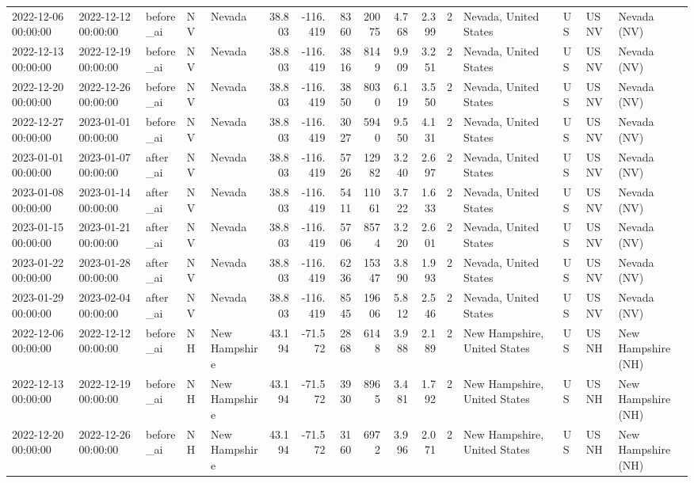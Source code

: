 \begin{tabular}{lllllrrrrrrlllll}
2022-12-06 00:00:00 & 2022-12-12 00:00:00 & before\_ai & NV & Nevada & 38.803 & -116.419 & 8360 & 20075 & 4.768 & 2.399 & 2 & Nevada, United States & US & USNV & Nevada (NV) \\
2022-12-13 00:00:00 & 2022-12-19 00:00:00 & before\_ai & NV & Nevada & 38.803 & -116.419 & 3816 & 8149 & 9.909 & 3.251 & 2 & Nevada, United States & US & USNV & Nevada (NV) \\
2022-12-20 00:00:00 & 2022-12-26 00:00:00 & before\_ai & NV & Nevada & 38.803 & -116.419 & 3850 & 8030 & 6.119 & 3.550 & 2 & Nevada, United States & US & USNV & Nevada (NV) \\
2022-12-27 00:00:00 & 2023-01-01 00:00:00 & before\_ai & NV & Nevada & 38.803 & -116.419 & 3027 & 5940 & 9.550 & 4.131 & 2 & Nevada, United States & US & USNV & Nevada (NV) \\
2023-01-01 00:00:00 & 2023-01-07 00:00:00 & after\_ai & NV & Nevada & 38.803 & -116.419 & 5726 & 12982 & 3.240 & 2.697 & 2 & Nevada, United States & US & USNV & Nevada (NV) \\
2023-01-08 00:00:00 & 2023-01-14 00:00:00 & after\_ai & NV & Nevada & 38.803 & -116.419 & 5411 & 11061 & 3.722 & 1.633 & 2 & Nevada, United States & US & USNV & Nevada (NV) \\
2023-01-15 00:00:00 & 2023-01-21 00:00:00 & after\_ai & NV & Nevada & 38.803 & -116.419 & 5706 & 8574 & 3.220 & 2.601 & 2 & Nevada, United States & US & USNV & Nevada (NV) \\
2023-01-22 00:00:00 & 2023-01-28 00:00:00 & after\_ai & NV & Nevada & 38.803 & -116.419 & 6236 & 15347 & 3.890 & 1.993 & 2 & Nevada, United States & US & USNV & Nevada (NV) \\
2023-01-29 00:00:00 & 2023-02-04 00:00:00 & after\_ai & NV & Nevada & 38.803 & -116.419 & 8545 & 19606 & 5.812 & 2.546 & 2 & Nevada, United States & US & USNV & Nevada (NV) \\
2022-12-06 00:00:00 & 2022-12-12 00:00:00 & before\_ai & NH & New Hampshire & 43.194 & -71.572 & 2868 & 6148 & 3.988 & 2.189 & 2 & New Hampshire, United States & US & USNH & New Hampshire (NH) \\
2022-12-13 00:00:00 & 2022-12-19 00:00:00 & before\_ai & NH & New Hampshire & 43.194 & -71.572 & 3930 & 8965 & 3.481 & 1.792 & 2 & New Hampshire, United States & US & USNH & New Hampshire (NH) \\
2022-12-20 00:00:00 & 2022-12-26 00:00:00 & before\_ai & NH & New Hampshire & 43.194 & -71.572 & 3160 & 6972 & 3.996 & 2.071 & 2 & New Hampshire, United States & US & USNH & New Hampshire (NH) \\

\end{tabular}

